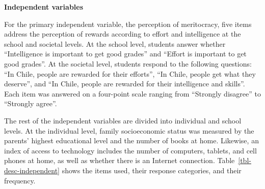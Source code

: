 \documentclass[
  letterpaper,
  DIV=11,
  numbers=noendperiod]{scrartcl}
\begin{document}
\textbf{Independent variables}

For the primary independent variable, the perception of meritocracy,
five items address the perception of rewards according to effort and
intelligence at the school and societal levels. At the school level,
students answer whether ``Intelligence is important to get good grades''
and ``Effort is important to get good grades''. At the societal level,
students respond to the following questions: ``In Chile, people are
rewarded for their efforts'', ``In Chile, people get what they
deserve'', and ``In Chile, people are rewarded for their intelligence
and skills''. Each item was answered on a four-point scale ranging from
``Strongly disagree'' to ``Strongly agree''.

The rest of the independent variables are divided into individual and
school levels. At the individual level, family socioeconomic status was
measured by the parents' highest educational level and the number of
books at home. Likewise, an index of access to technology includes the
number of computers, tablets, and cell phones at home, as well as
whether there is an Internet connection.
Table~\ref{tbl-desc-independent} shows the items used, their response
categories, and their frequency.
\end{document}
